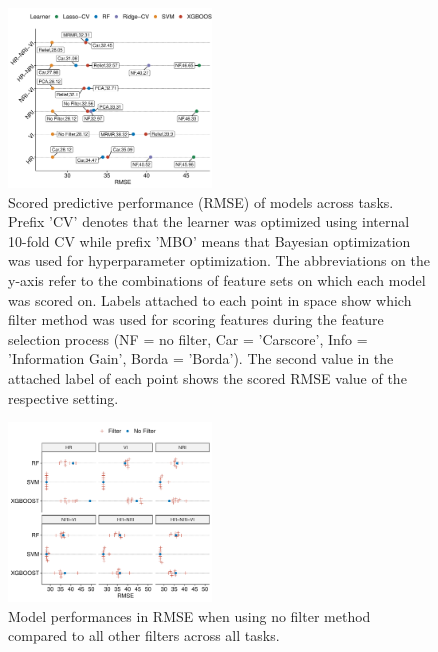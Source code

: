 \documentclass[letterpaper, peerreview]{IEEEtran}
\begin{document}


\begin{figure} [t!]
	\centering
	\begin{center}
		\includegraphics[width=0.48\textwidth] {performance-results-1.pdf}
		\caption{Scored predictive performance (RMSE) of models across tasks. Prefix 'CV' denotes that the learner was optimized using internal 10-fold CV while prefix 'MBO' means that Bayesian optimization was used for hyperparameter optimization. The abbreviations on the y-axis refer to the combinations of feature sets on which each model was scored on. Labels attached to each point in space show which filter method was used for scoring features during the feature selection process (NF = no filter, Car = 'Carscore', Info = 'Information Gain', Borda = 'Borda'). The second value in the attached label of each point shows the scored RMSE value of the respective setting.}\label{fig:perf-result}
	\end{center}
\end{figure}

\begin{figure} [t!]
	\centering
	\begin{center}
		\includegraphics[width=0.48\textwidth] {filter-effect-all-vs-no-filter-1.pdf}
		\caption{Model performances in RMSE when using no filter method compared to all other filters across all tasks.}\label{fig:filter-effects-no-filter}
	\end{center}
\end{figure}
\end{document}
